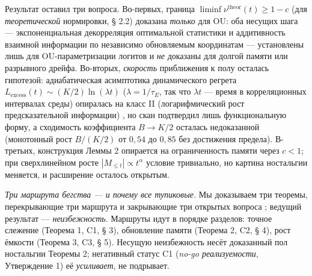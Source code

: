 \documentclass[12pt]{iopart}
\begin{document}
Результат \cite{Andriishin2026b} оставил три вопроса. Во-первых, граница \(\liminf \nu^{\text{theor}}(t) \ge 1 - c\) (для \emph{теоретической} нормировки, § 2.2) доказана \emph{только} для OU: оба несущих шага --- экспоненциальная декорреляция оптимальной статистики и аддитивность взаимной информации по независимо обновляемым координатам --- установлены лишь для OU-параметризации логитов и \emph{не} доказаны для долгой памяти или разрывного дрейфа. Во-вторых, \emph{скорость} приближения к полу осталась гипотезой: адиабатическая асимптотика динамического регрета \(L_{\text{excess}}(t) \sim (K/2)\ln(\lambda t)\) (\(\lambda = 1/\tau_E\), так что \(\lambda t\) --- время в корреляционных интервалах среды) опиралась на класс II (логарифмический рост предсказательной информации) \cite{BialekNemenmanTishby2001}, но скан подтвердил лишь функциональную форму, а сходимость коэффициента \(B \to K/2\) осталась недоказанной (монотонный рост \(B/(K/2)\) от \(0{,}54\) до \(0{,}85\) без достижения предела). В-третьих, конструкция Леммы 2 опирается на ограниченность памяти через \(c < 1\); при сверхлинейном росте \(|M_{\le t}| \propto t^\alpha\) условие тривиально, но картина ностальгии меняется, и расширение осталось открытым.



\emph{Три маршрута бегства --- и почему все тупиковые.} Мы доказываем три теоремы, перекрывающие три маршрута и закрывающие три открытых вопроса \cite{Andriishin2026b}; ведущий результат --- \emph{неизбежность}. Маршруты идут в порядке разделов: точное слежение (Теорема 1, C1, § 3), обновление памяти (Теорема 2, C2, § 4), рост ёмкости (Теорема 3, C3, § 5). Несущую неизбежность несёт доказанный пол ностальгии Теоремы 2; негативный статус C1 (\emph{no-go реализуемости}, Утверждение 1) её \emph{усиливает}, не подрывает.
\end{document}
